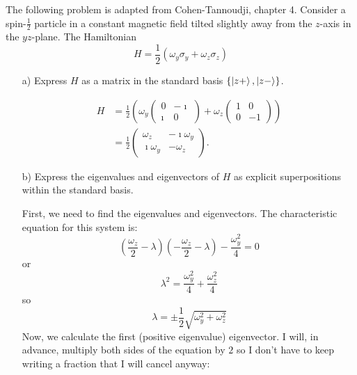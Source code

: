 \documentclass[a4paper,twoside]{article}
\begin{document}
The following problem is adapted from Cohen-Tannoudji, chapter 4. Consider a spin-$\frac{1}{2}$ particle in a constant magnetic field tilted slightly away from the $z$-axis in the $yz$-plane. The Hamiltonian
\begin{equation}
    H = \frac{1}{2}\left( \omega_y\sigma_y + \omega_z\sigma_z \right) 
\end{equation}
\begin{itemize}
    \item[a)] Express $H$ as a matrix in the standard basis $ \{\ket{z+},\ket{z-}\}$.
\begin{tcolorbox}
    \begin{align*}
        H &= \frac{1}{2}\left( \omega_y \begin{pmatrix} 0&-\imath \\ \imath & 0 \end{pmatrix} + \omega_z \begin{pmatrix} 1&0\\0&-1 \end{pmatrix} \right)\\
        &= \frac{1}{2} \begin{pmatrix} \omega_z & -\imath\omega_y \\ \imath\omega_y & -\omega_z \end{pmatrix} 
    .\end{align*}
\end{tcolorbox}
    \item[b)] Express the eigenvalues and eigenvectors of $H$ as explicit superpositions within the standard basis.
        \begin{tcolorbox}[breakable]
    First, we need to find the eigenvalues and eigenvectors. The characteristic equation for this system is:
    \begin{equation}
        \left(\frac{\omega_z}{2}-\lambda\right)\left(-\frac{\omega_z}{2}-\lambda\right) - \frac{\omega_y^2}{4} = 0
    \end{equation}
    or
    \begin{equation}
        \lambda^2 = \frac{\omega_y^2}{4} + \frac{\omega_z^2}{4} 
    \end{equation}
    so
    \begin{equation}
        \lambda = \pm\frac{1}{2}\sqrt{\omega_y^2 + \omega_z^2} 
    \end{equation}
    Now, we calculate the first (positive eigenvalue) eigenvector. I will, in advance, multiply both sides of the equation by $2$ so I don't have to keep writing a fraction that I will cancel anyway:

\end{tcolorbox}
\end{itemize}
\end{document}
